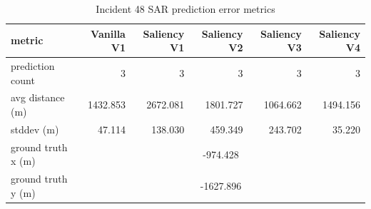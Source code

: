 \begin{table}[ht]
\centering
\caption{Incident 48 SAR prediction error metrics}
\label{tab:sar-incident-48}
\begin{tabular}{lrrrrr}
\hline
metric & Vanilla V1 & Saliency V1 & Saliency V2 & Saliency V3 & Saliency V4 \\
\hline
prediction count & 3 & 3 & 3 & 3 & 3 \\
avg distance (m) & 1432.853 & 2672.081 & 1801.727 & 1064.662 & 1494.156 \\
stddev (m) & 47.114 & 138.030 & 459.349 & 243.702 & 35.220 \\
ground truth x (m) & \multicolumn{5}{c}{-974.428} \\
ground truth y (m) & \multicolumn{5}{c}{-1627.896} \\
\hline
\end{tabular}
\end{table}
